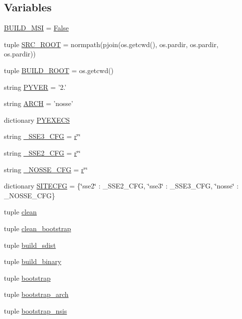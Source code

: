 \subsection*{Variables}
\begin{DoxyCompactItemize}
\item 
\hyperlink{namespacepavement_aa417dc73ad8dee68e880e84da3f7afc7}{B\+U\+I\+L\+D\+\_\+\+M\+S\+I} = \hyperlink{libqhull_8h_a306ebd41c0cd1303b1372c6153f0caf8}{False}
\item 
tuple \hyperlink{namespacepavement_a4ad470d58095dd6fd0ddede7e8d7beac}{S\+R\+C\+\_\+\+R\+O\+O\+T} = normpath(pjoin(os.\+getcwd(), os.\+pardir, os.\+pardir, os.\+pardir))
\item 
tuple \hyperlink{namespacepavement_a61828f3c20b7f24bfc0770533ac77c69}{B\+U\+I\+L\+D\+\_\+\+R\+O\+O\+T} = os.\+getcwd()
\item 
string \hyperlink{namespacepavement_ae43a0d03b5debefbb49ed19685cdb0db}{P\+Y\+V\+E\+R} = '2.'
\item 
string \hyperlink{namespacepavement_af9b61ef3b4f366988b3f22be0a52eeb6}{A\+R\+C\+H} = 'nosse'
\item 
dictionary \hyperlink{namespacepavement_a82d9e979fa2f57253e3bf6c59af5c791}{P\+Y\+E\+X\+E\+C\+S}
\item 
string \hyperlink{namespacepavement_a7f93afb5adc0db4d8a7a613203e65539}{\+\_\+\+S\+S\+E3\+\_\+\+C\+F\+G} = \hyperlink{indexexpr_8h_ac434fd11cc2493608d8d91424d60c17e}{r}\char`\"{}\char`\"{}
\item 
string \hyperlink{namespacepavement_ab9152cc0da5073b48d1c0f0f28647d51}{\+\_\+\+S\+S\+E2\+\_\+\+C\+F\+G} = \hyperlink{indexexpr_8h_ac434fd11cc2493608d8d91424d60c17e}{r}\char`\"{}\char`\"{}
\item 
string \hyperlink{namespacepavement_a85f7ecae0b58d0823b0e61f1b9e96fe9}{\+\_\+\+N\+O\+S\+S\+E\+\_\+\+C\+F\+G} = \hyperlink{indexexpr_8h_ac434fd11cc2493608d8d91424d60c17e}{r}\char`\"{}\char`\"{}
\item 
dictionary \hyperlink{namespacepavement_aa956087044872a74ace6e2618c0ae2c6}{S\+I\+T\+E\+C\+F\+G} = \{\char`\"{}sse2\char`\"{} \+: \+\_\+\+S\+S\+E2\+\_\+\+C\+F\+G, \char`\"{}sse3\char`\"{} \+: \+\_\+\+S\+S\+E3\+\_\+\+C\+F\+G, \char`\"{}nosse\char`\"{} \+: \+\_\+\+N\+O\+S\+S\+E\+\_\+\+C\+F\+G\}
\item 
tuple \hyperlink{namespacepavement_a522eb2426d7492ec5e58f9d33c57383b}{clean}
\item 
tuple \hyperlink{namespacepavement_a8e1619326965293da2fa40f456fae450}{clean\+\_\+bootstrap}
\item 
tuple \hyperlink{namespacepavement_af47ce1886b9730a3f237f22147cdba3e}{build\+\_\+sdist}
\item 
tuple \hyperlink{namespacepavement_a532e8b94130cb5287bc214b21aae0198}{build\+\_\+binary}
\item 
tuple \hyperlink{namespacepavement_afd7cf56b49905c839c296db9350d1c49}{bootstrap}
\item 
tuple \hyperlink{namespacepavement_a53c9cb1169160b2723dbc14bfd9f59b8}{bootstrap\+\_\+arch}
\item 
tuple \hyperlink{namespacepavement_a749c3a2666192fd74e3cdc0a4d9f1a12}{bootstrap\+\_\+nsis}
\end{DoxyCompactItemize}


